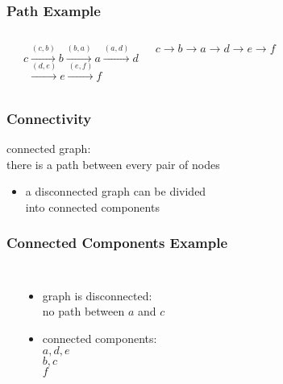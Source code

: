 \documentclass[dvipsnames]{beamer}
\begin{document}
\begin{frame}
  \frametitle{Path Example}

  \begin{example}
    \begin{columns}
      \begin{center}
      \end{center}

      $c \xrightarrow{(c,b)} b \xrightarrow{(b,a)} a \xrightarrow{(a,d)} d$\\
      $~~\xrightarrow{(d,e)} e \xrightarrow{(e,f)} f$

      \medskip
      $c \rightarrow b \rightarrow a \rightarrow d \rightarrow e \rightarrow f$
    \end{columns}
  \end{example}
\end{frame}

\begin{frame}
  \frametitle{Connectivity}

  \begin{definition}
    \alert{connected} graph:\\
    there is a path between every pair of nodes
  \end{definition}

  \begin{itemize}
    \item a disconnected graph can be divided\\
      into connected components
  \end{itemize}
\end{frame}

\begin{frame}
  \frametitle{Connected Components Example}

  \begin{example}
    \begin{columns}
      \begin{center}
      \end{center}

      \begin{itemize}
        \item graph is disconnected:\\
          no path between $a$ and $c$
        \item connected components:\\
          $a,d,e$\\
          $b,c$\\
          $f$
      \end{itemize}
    \end{columns}
  \end{example}
\end{frame}
\end{document}
